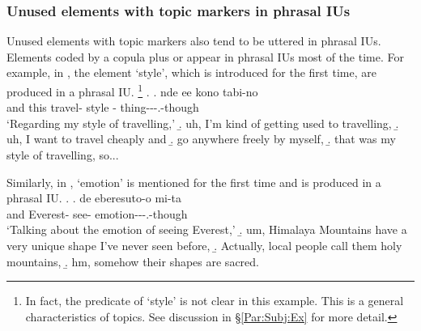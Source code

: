 \subsubsection{Unused elements with topic markers in phrasal IUs}\label{Int:Cor:InacTopic:PIU}

Unused elements with topic markers also tend to be uttered in
phrasal IUs.
Elements coded by a copula plus  or  appear
in phrasal IUs most of the time.
For example, in \Next[a],
the element  `style', which is introduced for the first time,
are produced in a phrasal IU.%
	\footnote{
	In fact, the predicate of `style' is not clear in this example.
	This is a general characteristics of topics.
	See discussion in \S \ref{Par:Subj:Ex} for more detail.
	}
%
\ex.
 \ag. nde {\iub} ee {\iub} kono {\iub} tabi-no {\iub}  {\iub}   {\iub} \\
      and {}  {} this {} travel- {} style {} - thing---.-though \\
      `Regarding my style of travelling,'
 \b. uh, I'm kind of getting used to travelling,
 \b. uh, I want to travel cheaply and
 \b. go anywhere freely by myself,
 \b. that was my style of travelling, so...

Similarly,
in \Next[a],
 `emotion' is mentioned for the first time and
is produced in a phrasal IU.
%
\ex.
 \ag. de eberesuto-o mi-ta  {\iub} \\
      and Everest- see- emotion---.-though {} \\
      `Talking about the emotion of seeing Everest,'
 \b. um, Himalaya Mountains have a very unique shape I've never seen before,
 \b. Actually, local people call them holy mountains,
 \b. hm, somehow their shapes are sacred.


